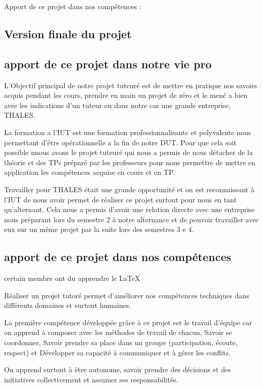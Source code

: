 \documentclass{PackagerQualityN}
\begin{document}
Apport de ce projet dans nos compétences :




\subsection{Version finale du projet}

\subsection{apport de ce projet dans notre vie pro}

L’Objectif principal de notre projet tuteuré est de mettre en pratique nos savoirs acquis pendant les cours, prendre en main un projet de zéro et le mené a bien avec les indications d'un tuteur ou dans notre cas une grande entreprise, THALES. 

La formation a l'IUT est une formation professionnalisante et polyvalente nous permettant d'être opérationnelle a la fin de notre DUT. Pour que cela soit possible nnous avons le projet tuteuré qui nous a permis de nous détacher de la théorie et des TPs préparé par les professeurs pour nous permettre de mettre en application les compétences acquise en cours et en TP. 

Travailler pour THALES était une grande opportunité et on est reconnaissant à l'IUT de nous avoir permet de réaliser ce projet surtout pour nous en tant qu'alternant. Cela nous a permis d’avoir une relation directe avec une entreprise nous préparant lors du semestre 2 à notre alternance et de pouvoir travailler avec eux sur un même projet par la suite lors des semestres 3 e 4.

\subsection{apport de ce projet dans nos compétences}
certain membre ont du apprendre le \LaTeX


Réaliser un projet tutoré permet d’améliorer nos compétences techniques dans différents domaines et surtout humaines.

La première compétence développée grâce à ce projet est le travail d’équipe car on apprend à composer avec les méthodes de travail de chacun, Savoir se coordonner, Savoir prendre sa place dans un groupe (participation, écoute, respect) et Développer sa capacité à communiquer et à gérer les conflits.

On apprend surtout à être autonome, savoir prendre des décisions et des initiatives collectivement et assumer ses responsabilités.
\end{document}
